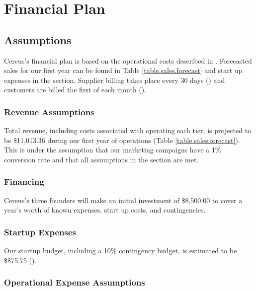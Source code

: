 {\let\cleardoublepage\relax \chapter*{Financial Plan}}

\section{Assumptions}

Cereus's financial plan is based on the operational costs described in . Forecasted sales for our first year can be found in Table \ref{table.sales.forecast} and start up expenses in the  section. Supplier billing takes place every 30 days () and customers are billed the first of each month ().

\subsection{Revenue Assumptions}

Total revenue, including costs associated with operating each tier, is projected to be \$11,013.36 during our first year of operations (Table \ref{table.sales.forecast}). This is under the assumption that our marketing campaigns have a 1\% conversion rate and that all assumptions in the  section are met.

\subsection{Financing}

Cereus's three founders will make an initial investment of \$8,500.00 to cover a year's worth of known expenses, start up costs, and contingencies.

\subsection{Startup Expenses}

Our startup budget, including a 10\% contingency budget, is estimated to be \$875.75 ().

\subsection{Operational Expense Assumptions}

